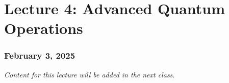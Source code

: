 \documentclass{article}
\begin{document}
\newpage
\section{Lecture 4: Advanced Quantum Operations}
\subsubsection*{February 3, 2025}

\emph{Content for this lecture will be added in the next class.}
\end{document}
